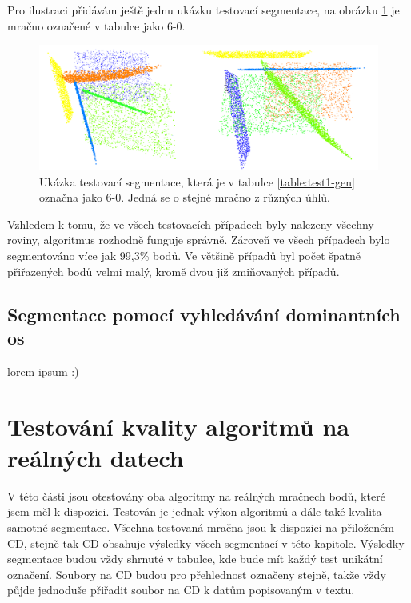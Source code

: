 \documentclass[11pt,twoside,a4paper]{book}
\begin{document}
Pro ilustraci přidávám ještě jednu ukázku testovací segmentace, na obrázku \ref{fig:test-6-0} je mračno označené v tabulce jako 6-0.

\begin{figure}[H]
\begin{center}
\includegraphics[width=\textwidth]{figures/test-6-0}
\caption{Ukázka testovací segmentace, která je v tabulce \ref{table:test1-gen} označna jako 6-0. Jedná se o stejné mračno z různých úhlů.}
\label{fig:test-6-0}
\end{center}
\end{figure}

Vzhledem k tomu, že ve všech testovacích případech byly nalezeny všechny roviny, algoritmus rozhodně funguje správně. Zároveň ve všech případech bylo segmentováno více jak 99,3\% bodů. Ve většině případů byl počet špatně přiřazených bodů velmi malý, kromě dvou již zmiňovaných případů.

\subsection{Segmentace pomocí vyhledávání dominantních os}

lorem ipsum :)


\newpage
\section{Testování kvality algoritmů na reálných datech}

V této části jsou otestovány oba algoritmy na reálných mračnech bodů, které jsem měl k dispozici. Testován je jednak výkon algoritmů a dále také kvalita samotné segmentace. Všechna testovaná mračna jsou k dispozici na přiloženém CD, stejně tak CD obsahuje výsledky všech segmentací v této kapitole. Výsledky segmentace budou vždy shrnuté v tabulce, kde bude mít každý test unikátní označení. Soubory na CD budou pro přehlednost označeny stejně, takže vždy půjde jednoduše přiřadit soubor na CD k datům popisovaným v textu.
\end{document}

